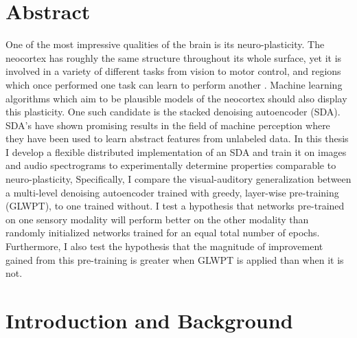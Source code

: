 \documentclass[12pt]{article}
\begin{document}
\section*{Abstract}
\label{Abstract}
\begin{doublespacing}

One of the most impressive qualities of the brain is its neuro-plasticity. The neocortex has roughly the same structure throughout its whole surface, yet it is involved in a variety of different tasks from vision to motor control, and regions which once performed one task can learn to perform another \cite{hawkins2004intelligence}. Machine learning algorithms which aim to be plausible models of the neocortex should also display this plasticity. One such candidate is the stacked denoising autoencoder (SDA). SDA's have shown promising results in the field of machine perception where they have been used to learn abstract features from unlabeled data. \cite{larochelle2007empirical, le2011building, vincent2008extracting} In this thesis I develop a flexible distributed implementation of an SDA and train it on images and audio spectrograms to experimentally determine properties comparable to neuro-plasticity, Specifically, I compare the visual-auditory generalization between a multi-level denoising autoencoder trained with greedy, layer-wise pre-training (GLWPT), to one trained without. I test a hypothesis that networks pre-trained on one sensory modality will perform better on the other modality than randomly initialized networks trained for an equal total number of epochs. Furthermore, I also test the hypothesis that the magnitude of improvement gained from this pre-training is greater when GLWPT is applied than when it is not.

\section{Introduction and Background}


\end{doublespacing}
\end{document}
